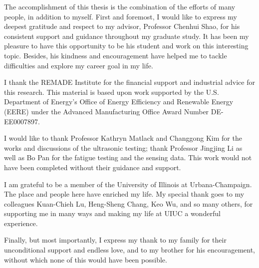 The accomplishment of this thesis is the combination of the efforts of many people, in addition to myself. First and foremost, I would like to express my deepest gratitude and respect to my advisor, Professor Chenhui Shao, for his consistent support and guidance throughout my graduate study. It has been my pleasure to have this opportunity to be his student and work on this interesting topic. Besides, his kindness and encouragement have helped me to tackle difficulties and explore my career goal in my life.

I thank the REMADE Institute for the financial support and industrial advice for this research. This material is based upon work supported by the U.S. Department of Energy’s Office of Energy Efficiency and Renewable Energy (EERE) under the Advanced Manufacturing Office Award Number DE-EE0007897.

I would like to thank Professor Kathryn Matlack and Changgong Kim for the works and discussions of the ultrasonic testing; thank Professor Jingjing Li as well as Bo Pan for the fatigue testing and the sensing data. This work would not have been completed without their guidance and support.

I am grateful to be a member of the University of Illinois at Urbana-Champaign. The place and people here have enriched my life. My special thank goes to my colleagues Kuan-Chieh Lu, Heng-Sheng Chang, Keo Wu, and so many others, for supporting me in many ways and making my life at UIUC a wonderful experience.

Finally, but most importantly, I express my thank to my family for their unconditional support and endless love, and to my brother for his encouragement, without which none of this would have been possible.